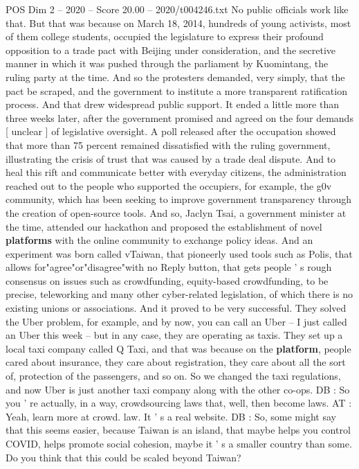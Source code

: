 \begin{textsample}{POS Dim 2 – 2020 – Score 20.00 – 2020/t004246.txt}
No public officials work like that.
But that was because on March 18, 2014, hundreds of young activists, most of them college students, occupied the legislature to express their profound opposition to a trade pact with Beijing under consideration, and the secretive manner in which it was pushed through the parliament by Kuomintang, the ruling party at the time.
And so the protesters demanded, very simply, that the pact be scraped, and the government to institute a more transparent ratification process.
And that drew widespread public support.
It ended a little more than three weeks later, after the government promised and agreed on the four demands [ unclear ] of legislative oversight.
A poll released after the occupation showed that more than 75 percent remained dissatisfied with the ruling government, illustrating the crisis of trust that was caused by a trade deal dispute.
And to heal this rift and communicate better with everyday citizens, the administration reached out to the people who supported the occupiers, for example, the g0v community, which has been seeking to improve government transparency through the creation of open-source tools.
And so, Jaclyn Tsai, a government minister at the time, attended our hackathon and proposed the establishment of novel \textbf{platforms} with the online community to exchange policy ideas.
And an experiment was born called vTaiwan, that pioneerly used tools such as Polis, that allows for"agree"or"disagree"with no Reply button, that gets people ' s rough consensus on issues such as crowdfunding, equity-based crowdfunding, to be precise, teleworking and many other cyber-related legislation, of which there is no existing unions or associations.
And it proved to be very successful.
They solved the Uber problem, for example, and by now, you can call an Uber -- I just called an Uber this week -- but in any case, they are operating as taxis.
They set up a local taxi company called Q Taxi, and that was because on the \textbf{platform}, people cared about insurance, they care about registration, they care about all the sort of, protection of the passengers, and so on.
So we changed the taxi regulations, and now Uber is just another taxi company along with the other co-ops.
DB : So you ' re actually, in a way, crowdsourcing laws that, well, then become laws.
AT : Yeah, learn more at crowd. law.
It ' s a real website.
DB : So, some might say that this seems easier, because Taiwan is an island, that maybe helps you control COVID, helps promote social cohesion, maybe it ' s a smaller country than some.
Do you think that this could be scaled beyond Taiwan?

\end{textsample}
